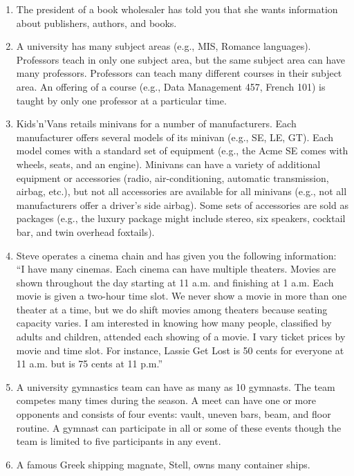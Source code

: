 \documentclass[
]{article}
\begin{document}
\begin{enumerate}
\def\labelenumi{\arabic{enumi}.}
\item
  The president of a book wholesaler has told you that she wants
  information about publishers, authors, and books.
\item
  A university has many subject areas (e.g., MIS, Romance languages).
  Professors teach in only one subject area, but the same subject area
  can have many professors. Professors can teach many different
  courses in their subject area. An offering of a course (e.g., Data
  Management 457, French 101) is taught by only one professor at a
  particular time.
\item
  Kids'n'Vans retails minivans for a number of manufacturers. Each
  manufacturer offers several models of its minivan (e.g., SE, LE,
  GT). Each model comes with a standard set of equipment (e.g., the
  Acme SE comes with wheels, seats, and an engine). Minivans can have
  a variety of additional equipment or accessories (radio,
  air-conditioning, automatic transmission, airbag, etc.), but not all
  accessories are available for all minivans (e.g., not all
  manufacturers offer a driver's side airbag). Some sets of
  accessories are sold as packages (e.g., the luxury package might
  include stereo, six speakers, cocktail bar, and twin overhead
  foxtails).
\item
  Steve operates a cinema chain and has given you the following
  information:\\
  ``I have many cinemas. Each cinema can have multiple theaters. Movies
  are shown throughout the day starting at 11 a.m. and finishing at 1
  a.m. Each movie is given a two-hour time slot. We never show a movie
  in more than one theater at a time, but we do shift movies among
  theaters because seating capacity varies. I am interested in knowing
  how many people, classified by adults and children, attended each
  showing of a movie. I vary ticket prices by movie and time slot. For
  instance, Lassie Get Lost is 50 cents for everyone at 11 a.m. but is
  75 cents at 11 p.m.''
\item
  A university gymnastics team can have as many as 10 gymnasts. The
  team competes many times during the season. A meet can have one or
  more opponents and consists of four events: vault, uneven bars,
  beam, and floor routine. A gymnast can participate in all or some of
  these events though the team is limited to five participants in any
  event.
\item
  A famous Greek shipping magnate, Stell, owns many container ships.

\end{enumerate}
\end{document}
